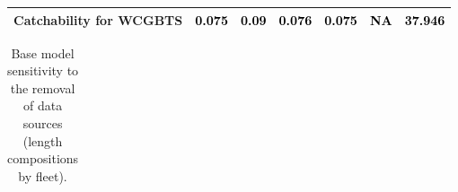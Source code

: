\documentclass[
  english,
]{article}
\begin{document}
\begin{landscape}
\begin{longtable}[t]{ll>{\raggedright\arraybackslash}p{5em}>{\raggedright\arraybackslash}p{5em}>{\raggedright\arraybackslash}p{5em}>{\raggedright\arraybackslash}p{5em}>{\raggedright\arraybackslash}p{5em}}
\hspace{1em}Catchability for WCGBTS & \textcolor{black}{0.075} & \textcolor{black}{0.09} & \textcolor{black}{0.076} & \textcolor{black}{0.075} & \textcolor{black}{NA} & \textcolor{black}{37.946}\\
\bottomrule

\end{longtable}

\endgroup{}


\end{landscape}

\newpage{}

\begin{landscape}
\begingroup\fontsize{9}{11}\selectfont

\begin{longtable}[t]{ll>{\raggedright\arraybackslash}p{4em}>{\raggedright\arraybackslash}p{4em}>{\raggedright\arraybackslash}p{4em}>{\raggedright\arraybackslash}p{4em}>{\raggedright\arraybackslash}p{4em}>{\raggedright\arraybackslash}p{4em}>{\raggedright\arraybackslash}p{4em}>{\raggedright\arraybackslash}p{4em}}

\caption{\label{tbl-sensitivities-like-lens1}Base model sensitivity to
the removal of data sources (length compositions by fleet).}

\tabularnewline


\end{longtable}
\end{landscape}
\end{document}
